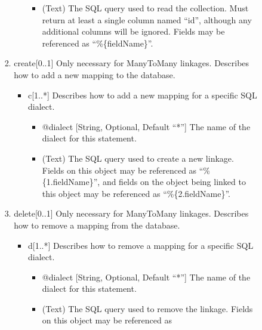 \documentclass{book}
\begin{document}
\begin{enumerate}
\begin{enumerate}
\begin{enumerate}
\begin{enumerate}
\begin{itemize}
\begin{itemize}
                        \item (Text) The SQL query used to read the collection.
                              Must return at least a single column named ``id'',
                              although any additional columns will be ignored.
                              Fields may be referenced as ``\%\{fieldName\}''.
                    \end{itemize}
                \end{itemize}
                \item create[0..1] Only necessary for ManyToMany linkages.
                      Describes how to add a new mapping to the database.
                \begin{itemize}
                    \item c[1..*] Describes how to add a new mapping for a
                          specific SQL dialect.
                    \begin{itemize}
                        \item @dialect [String, Optional, Default ``*''] The
                              name of the dialect for this statement.
                        \item (Text) The SQL query used to create a new linkage.
                              Fields on this object may be referenced as
                              ``\%\{1.fieldName\}'', and fields on the object
                              being linked to this object may be referenced as
                              ``\%\{2.fieldName\}''.
                    \end{itemize}
                \end{itemize}
                \item delete[0..1] Only necessary for ManyToMany linkages.
                      Describes how to remove a mapping from the database.
                \begin{itemize}
                    \item d[1..*] Describes how to remove a mapping for a
                          specific SQL dialect.
                    \begin{itemize}
                        \item @dialect [String, Optional, Default ``*''] The
                              name of the dialect for this statement.
                        \item (Text) The SQL query used to remove the linkage.
                              Fields on this object may be referenced as

\end{itemize}
\end{itemize}
\end{enumerate}
\end{enumerate}
\end{enumerate}
\end{enumerate}
\end{document}
